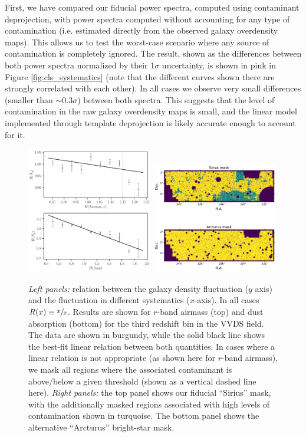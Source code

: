\documentclass[a4paper,11pt]{article}
\begin{document}
      First, we have compared our fiducial power spectra, computed using contaminant deprojection, with power spectra computed without accounting for any type of contamination (i.e. estimated directly from the observed galaxy overdensity maps). This allows us to test the worst-case scenario where any source of contamination is completely ignored. The result, shown as the differences between both power spectra normalized by their 1$\sigma$ uncertainty, is shown in pink in Figure \ref{fig:cls_systematics} (note that the different curves shown there are strongly correlated with each other). In all cases we observe very small differences (smaller than $\sim0.3\sigma$) between both spectra. This suggests that the level of contamination in the raw galaxy overdensity maps is small, and the linear model implemented through template deprojection is likely accurate enough to account for it.
      \begin{figure}
        \centering
        \includegraphics[width=0.49\textwidth]{figures/ndens_syst.pdf}
        \includegraphics[width=0.49\textwidth]{figures/systmask.pdf}
        \caption{{\sl Left panels:} relation between the galaxy density fluctuation ($y$ axis) and the fluctuation in different systematics ($x$-axis). In all cases $R(x)\equiv \sfrac{x}{\bar{x}}$. Results are shown for $r$-band airmass (top) and dust absorption (bottom) for the third redshift bin in the VVDS field. The data are shown in burgundy, while the solid black line shows the best-fit linear relation between both quantities. In cases where a linear relation is not appropriate (as shown here for $r$-band airmass), we mask all regions where the associated contaminant is above/below a given threshold (shown as a vertical dashed line here). {\sl Right panels:} the top panel shows our fiducial ``Sirius'' mask, with the additionally masked regions associated with high levels of contamination shown in turquoise. The bottom panel shows the alternative ``Arcturus'' bright-star mask.}
        \label{fig:ndens_syst}
      \end{figure}
      
\end{document}

